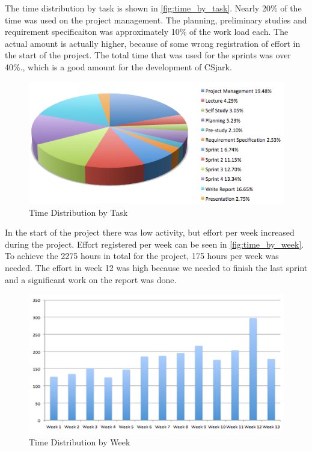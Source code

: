 The time distribution by task is shown in \autoref{fig:time_by_task}. Nearly 
20\% of the time was used on the project management. The planning, 
preliminary studies and requirement specificaiton was approximately 10\% of the work load
each. The actual amount is actually higher, because of some wrong registration of effort in the 
start of the project. The total time that was used for the sprints was over 
40\%., which is a good amount for the development of CSjark. 

\begin{figure}[htb]
	\center
	\includegraphics[width=\textwidth]{./evaluation/img/piechart_time}
	\caption{Time Distribution by Task\label{fig:time_by_task}}
\end{figure}

In the start of the project there was low activity, but effort per week 
increased during the project. Effort registered per week can be seen in 
\autoref{fig:time_by_week}. To achieve the 2275 hours in total for the 
project, 175 hours per week was needed. The effort in week 12 was high because 
we needed to finish the last sprint and a significant work on the report was done.

\begin{figure}[htb]
	\center
	\includegraphics[width=\textwidth]{./evaluation/img/columnchart_effort} 
	\caption{Time Distribution by Week\label{fig:time_by_week}}
\end{figure}

